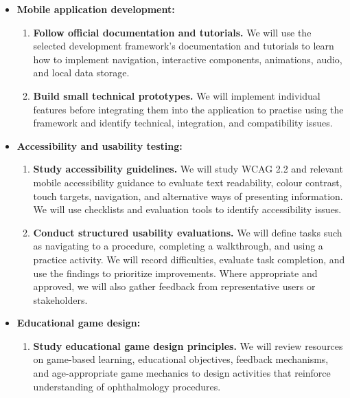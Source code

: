 \documentclass[12pt]{article}
\begin{document}
\begin{enumerate}
\begin{itemize}
        \item \textbf{Mobile application development:}
        \begin{enumerate}
            \item \textbf{Follow official documentation and tutorials.}
            We will use the selected development framework's documentation
            and tutorials to learn how to implement navigation,
            interactive components, animations, audio, and local
            data storage.

            \item \textbf{Build small technical prototypes.}
            We will implement individual features before integrating
            them into the application to practise using the framework
            and identify technical, integration, and compatibility issues.
        \end{enumerate}

        \item \textbf{Accessibility and usability testing:}
        \begin{enumerate}
            \item \textbf{Study accessibility guidelines.}
            We will study WCAG 2.2 and relevant mobile accessibility
            guidance to evaluate text readability, colour contrast,
            touch targets, navigation, and alternative ways of presenting
            information. We will use checklists and evaluation tools
            to identify accessibility issues.

            \item \textbf{Conduct structured usability evaluations.}
            We will define tasks such as navigating to a procedure,
            completing a walkthrough, and using a practice activity.
            We will record difficulties, evaluate task completion,
            and use the findings to prioritize improvements. Where
            appropriate and approved, we will also gather feedback
            from representative users or stakeholders.
        \end{enumerate}

        \item \textbf{Educational game design:}
        \begin{enumerate}
            \item \textbf{Study educational game design principles.}
            We will review resources on game-based learning, educational
            objectives, feedback mechanisms, and age-appropriate game
            mechanics to design activities that reinforce understanding
            of ophthalmology procedures.


\end{enumerate}
\end{itemize}
\end{enumerate}
\end{document}

